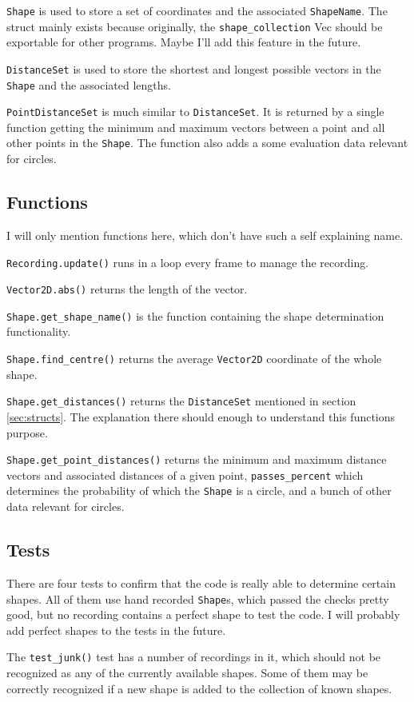 \documentclass[12pt, a4paper]{article}
\begin{document}
{                \texttt{Shape} is used to store a set of coordinates and the associated \texttt{ShapeName}. The struct mainly exists because originally, the \texttt{shape\_collection} Vec should be exportable for other programs. Maybe I'll add this feature in the future.\break

                \texttt{DistanceSet} is used to store the shortest and longest possible vectors in the \texttt{Shape} and the associated lengths.\break

                \texttt{PointDistanceSet} is much similar to \texttt{DistanceSet}. It is returned by a single function getting the minimum and maximum vectors between a point and all other points in the \texttt{Shape}. The function also adds a some evaluation data relevant for circles.

            \subsection{Functions}
                I will only mention functions here, which don't have such a self explaining name.\break

                \texttt{Recording.update()} runs in a loop every frame to manage the recording.\break

                \texttt{Vector2D.abs()} returns the length of the vector.\break

                \texttt{Shape.get\_shape\_name()} is the function containing the shape determination functionality.\break

                \texttt{Shape.find\_centre()} returns the average \texttt{Vector2D} coordinate of the whole shape.\break

                \texttt{Shape.get\_distances()} returns the \texttt{DistanceSet} mentioned in section \ref{sec:structs}. The explanation there should enough to understand this functions purpose.\break

                \texttt{Shape.get\_point\_distances()} returns the minimum and maximum distance vectors and associated distances of a given point, \texttt{passes\_percent} which determines the probability of which the \texttt{Shape} is a circle, and a bunch of other data relevant for circles.

        }
        \subsection{Tests}
            There are four tests to confirm that the code is really able to determine certain shapes. All of them use hand recorded \texttt{Shape}s, which passed the checks pretty good, but no recording contains a perfect shape to test the code. I will probably add perfect shapes to the tests in the future.

            The \texttt{test\_junk()} test has a number of recordings in it, which should not be recognized as any of the currently available shapes. Some of them may be correctly recognized if a new shape is added to the collection of known shapes.
\end{document}
